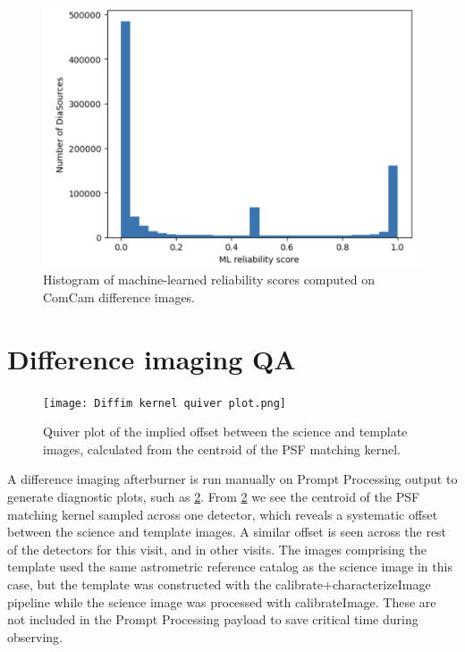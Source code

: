 \begin{figure}
\includegraphics[width=\textwidth]{dia/figures/reliability_histogram.png}
\caption{Histogram of machine-learned reliability scores computed on ComCam difference images. \label{fig:reliability_hist}}
\end{figure}

\section{Difference imaging QA}

\begin{figure}
\texttt{[image: Diffim kernel quiver plot.png]}
\caption{Quiver plot of the implied offset between the science and template images, calculated from the centroid of the PSF matching kernel. \label{fig:diffim-quiver}}
\end{figure}

A difference imaging afterburner is run manually on Prompt Processing output to generate diagnostic plots, such as \ref{fig:diffim-quiver}.
From \ref{fig:diffim-quiver} we see the centroid of the PSF matching kernel sampled across one detector, which reveals a systematic offset between the science and template images.
A similar offset is seen across the rest of the detectors for this visit, and in other visits.
The images comprising the template used the same astrometric reference catalog as the science image in this case, but the template was constructed with the calibrate+characterizeImage pipeline while the science image was processed with calibrateImage.
These are not included in the Prompt Processing payload to save critical time during observing.

